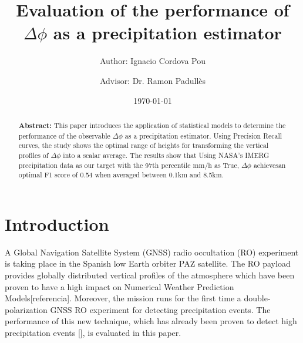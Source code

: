 \documentclass[twocolumn]{revtex4}
\begin{document}


\pagestyle{fancy}


\title{Evaluation of the performance of $\Delta \phi$ as a precipitation estimator}
\author{Author: Ignacio Cordova Pou}
\author{Advisor: Dr. Ramon Padullès}
\date{\today}

\begin{abstract}
{\bf Abstract:}
This paper introduces the application of statistical models 
to determine the performance of the observable $\Delta \phi$
as a precipitation estimator. Using Precision Recall curves, the 
study shows the optimal range of heights for transforming the vertical 
profiles of $\Delta\phi$ into a scalar average. The results show 
that Using NASA's IMERG precipitation data as our target with the 
97th percentile mm/h as True, $\Delta\phi$ achievesan optimal F1 score 
of 0.54 when averaged between 0.1km and 8.5km. 

\end{abstract}

\maketitle


\section{Introduction}

A Global Navigation Satellite System (GNSS) radio 
occultation (RO) experiment is taking place in the Spanish 
low Earth orbiter PAZ satellite. The RO payload provides
globally distributed vertical profiles of 
the atmosphere which have been proven to have a high impact on Numerical Weather
Prediction Models[referencia]. Moreover, the mission runs for the first
time a double-polarization GNSS RO experiment for detecting precipitation
events. The performance of this new technique, which has already been proven to detect high
precipitation events [], is evaluated in this paper.
\end{document}
